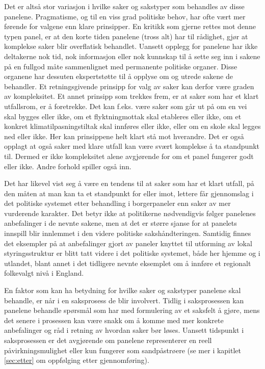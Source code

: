 \documentclass[
  12pt,
  a4paper, 12pt]{article}
\begin{document}
Det er altså stor variasjon i hvilke saker og sakstyper som behandles av disse panelene. Pragmatisme, og til en viss grad politiske behov, har ofte vært mer førende for valgene enn klare prinsipper. En kritikk som gjerne rettes mot denne typen panel, er at den korte tiden panelene (tross alt) har til rådighet, gjør at komplekse saker blir overflatisk behandlet. Uansett opplegg for panelene har ikke deltakerne nok tid, nok informasjon eller nok kunnskap til å sette seg inn i sakene på en fullgod måte sammenlignet med permanente politiske organer. Disse organene har dessuten ekspertstøtte til å opplyse om og utrede sakene de behandler. Et retningsgivende prinsipp for valg av saker kan derfor være graden av kompleksitet. Et annet prinsipp som trekkes frem, er at saker som har et klart utfallsrom, er å foretrekke. Det kan f.eks. være saker som går ut på om en vei skal bygges eller ikke, om et flyktningmottak skal etableres eller ikke, om et konkret klimatilpasningstiltak skal innføres eller ikke, eller om en skole skal legges ned eller ikke. Her kan prinsippene helt klart stå mot hverandre. Det er også opplagt at også saker med klare utfall kan være svært komplekse å ta standpunkt til. Dermed er ikke kompleksitet alene avgjørende for om et panel fungerer godt eller ikke. Andre forhold spiller også inn.

Det har likevel vist seg å være en tendens til at saker som har et klart utfall, på den måten at man kan ta et standpunkt for eller imot, lettere får gjennomslag i det politiske systemet etter behandling i borgerpaneler enn saker av mer vurderende karakter. Det betyr ikke at politikerne nødvendigvis følger panelenes anbefalinger i de nevnte sakene, men at det er større sjanse for at panelets innspill blir innlemmet i den videre politiske sakshåndteringen. Samtidig finnes det eksempler på at anbefalinger gjort av paneler knyttet til utforming av lokal styringsstruktur er blitt tatt videre i det politiske systemet, både her hjemme og i utlandet, blant annet i det tidligere nevnte eksemplet om å innføre et regionalt folkevalgt nivå i England.

En faktor som kan ha betydning for hvilke saker og sakstyper panelene skal behandle, er når i en saksprosess de blir involvert. Tidlig i saksprosessen kan panelene behandle spørsmål som har med formulering av et saksfelt å gjøre, mens det senere i prosessen kan være snakk om å komme med mer konkrete anbefalinger og råd i retning av hvordan saker bør løses. Uansett tidspunkt i saksprosessen er det avgjørende om panelene representerer en reell påvirkningsmulighet eller kun fungerer som sandpåstrøere (se mer i kapitlet \ref{sec:etter} om oppfølging etter gjennomføring).
\end{document}
